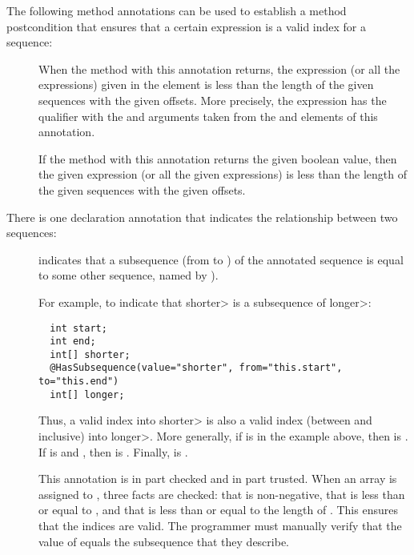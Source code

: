 The following method annotations can be used to establish a method postcondition
that ensures that a certain expression is a valid index for a sequence:

\begin{description}
\item[]
  When the method with this annotation returns, the expression (or all the expressions) given in the  element
  is less than the length of the given sequences with the given offsets. More precisely, the expression
  has the  qualifier with the  and  arguments
  taken from the  and  elements of this annotation.
\item[]
  If the method with this annotation returns the given boolean value,
  then the given expression (or all the given expressions)
  is less than the length of the given sequences with the given offsets.
\end{description}

There is one declaration annotation that indicates the relationship between
two sequences:

\begin{description}
\item[]
  indicates that a subsequence (from  to ) of the
  annotated sequence is equal to some other sequence, named by
  ).

For example, to indicate that \<shorter> is a subsequence of \<longer>:

\begin{Verbatim}
  int start;
  int end;
  int[] shorter;
  @HasSubsequence(value="shorter", from="this.start", to="this.end")
  int[] longer;
\end{Verbatim}

Thus, a valid index into \<shorter> is also a valid index (between
 and  inclusive) into \<longer>.  More generally,
if  is  in the example above, then
 is . If  is
 and , then  is . Finally,  is
.

This annotation is in part checked and in part trusted.  When an array is
assigned to , three facts are checked: that  is
non-negative, that  is less than or equal to , and
that  is less than or equal to the length of .  This
ensures that the indices are valid. The programmer must manually verify
that the value of  equals the subsequence that they describe.
\end{description}


